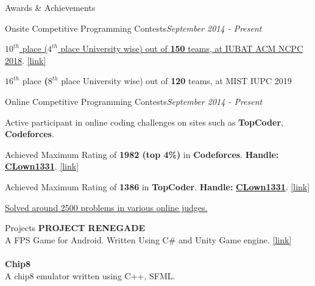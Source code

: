 \documentclass{resume}
\begin{document}
\begin{rSection}{Awards \& Achievements} 

\begin{rSubsection}{Onsite Competitive Programming Contests}{\em September 2014 - Present}{}{}{}
\item \href{https://icpc.baylor.edu/ICPCID/DII3NHEO8O8I}{\textbf{$10^{th}$} place (\textbf{$4^{th}$} place University wise) out of \textbf{150} teams, at IUBAT ACM NCPC 2018}. \href{https://icpc.baylor.edu/ICPCID/DII3NHEO8O8I}{[link]}
\item \textbf{$16^{th}$} place \textbf(\textbf{$8^{th}$} place University wise) out of \textbf{120} teams, at MIST IUPC 2019
\end{rSubsection}

\begin{rSubsection}{Online Competitive Programming Contests}{\em September 2014 - Present}{}{}{}
\item Active participant in online coding challenges on sites such as \textbf{TopCoder}, \textbf{Codeforces}.
\item Achieved Maximum Rating of \textbf{1982 (top 4\%)} in \textbf{Codeforces}. \textbf{Handle:} \textbf{\href{http://codeforces.com/profile/CLown1331}{CLown1331}}. \href{http://codeforces.com/profile/CLown1331}{[link]}
\item Achieved Maximum Rating of \textbf{1386} in \textbf{TopCoder}. \textbf{Handle:} \textbf{\href{https://www.topcoder.com/members/CLown1331/}{CLown1331}}. \href{https://www.topcoder.com/members/CLown1331/}{[link]}
\item \href{https://www.stopstalk.com/user/profile/clown1331}{Solved around 2500 problems in various online judges.}
\end{rSubsection}

\end{rSection}

\begin{rSection}{Projects}
{\bf PROJECT RENEGADE}\\
A FPS Game for Android.
Written Using C\# and Unity Game engine. \href{https://knights-of-orange.itch.io/project-renegade}{[link]}\\ 
\\{\bf Chip8}\\
A chip8 emulator written using C++, SFML.\\
\end{rSection}
\end{document}

